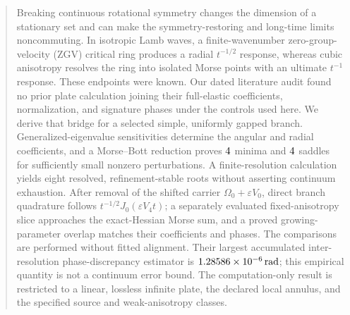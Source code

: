 \begin{abstract}
Breaking continuous rotational symmetry changes the dimension of a stationary
set and can make the symmetry-restoring and long-time limits noncommuting.  In
isotropic Lamb waves, a finite-wavenumber zero-group-velocity (ZGV) critical
ring produces a radial \(t^{-1/2}\) response, whereas cubic anisotropy resolves
the ring into isolated Morse points with an ultimate \(t^{-1}\) response.
These endpoints were known.  Our dated literature audit found no prior plate
calculation joining their full-elastic coefficients, normalization, and
signature phases under the controls used here.  We derive that bridge for a
selected simple, uniformly gapped branch.
Generalized-eigenvalue sensitivities determine the angular and radial coefficients, and a
Morse--Bott reduction proves \(\MorseMinimumCount\) minima and
\(\MorseSaddleCount\) saddles for sufficiently small nonzero perturbations.  A
finite-resolution calculation yields eight resolved, refinement-stable roots
without asserting continuum exhaustion.  After removal of the shifted carrier
\(\Omega_0+\varepsilon V_0\), direct branch quadrature follows
\(t^{-1/2}J_0(\varepsilon V_4t)\); a separately evaluated fixed-anisotropy slice
approaches the exact-Hessian Morse sum, and a proved growing-parameter overlap
matches their coefficients and phases.  The comparisons are performed without
fitted alignment.  Their largest accumulated inter-resolution
phase-discrepancy estimator is \(\MaxPhaseError\,\mathrm{rad}\); this empirical
quantity is not a continuum error bound.  The computation-only result is
restricted to a linear, lossless infinite plate, the declared local annulus,
and the specified source and weak-anisotropy classes.
\end{abstract}
